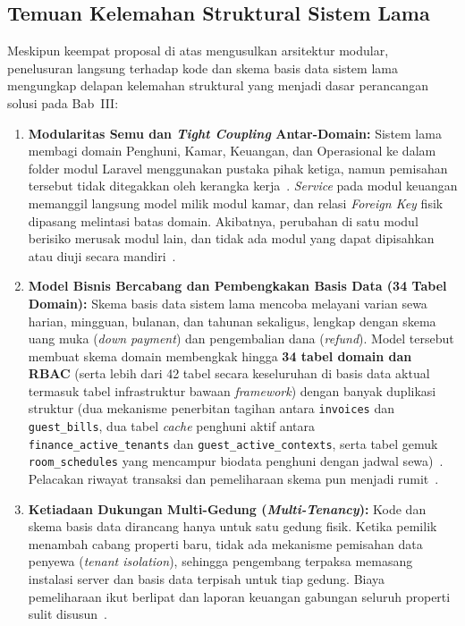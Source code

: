 \subsection{Temuan Kelemahan Struktural Sistem Lama}

Meskipun keempat proposal di atas mengusulkan arsitektur modular, penelusuran langsung terhadap kode dan skema basis data sistem lama mengungkap delapan kelemahan struktural yang menjadi dasar perancangan solusi pada Bab~III:

\begin{enumerate}[label=\arabic*., leftmargin=*]
  \item \textbf{Modularitas Semu dan \textit{Tight Coupling} Antar-Domain:}
    Sistem lama membagi domain Penghuni, Kamar, Keuangan, dan Operasional ke dalam folder modul Laravel menggunakan pustaka pihak ketiga, namun pemisahan tersebut tidak ditegakkan oleh kerangka kerja~\cite{alqoran2025}. \textit{Service} pada modul keuangan memanggil langsung model milik modul kamar, dan relasi \textit{Foreign Key} fisik dipasang melintasi batas domain. Akibatnya, perubahan di satu modul berisiko merusak modul lain, dan tidak ada modul yang dapat dipisahkan atau diuji secara mandiri~\cite{alqoran2025}.
  \item \textbf{Model Bisnis Bercabang dan Pembengkakan Basis Data (34 Tabel Domain):}
    Skema basis data sistem lama mencoba melayani varian sewa harian, mingguan, bulanan, dan tahunan sekaligus, lengkap dengan skema uang muka (\textit{down payment}) dan pengembalian dana (\textit{refund}). Model tersebut membuat skema domain membengkak hingga \textbf{34 tabel domain dan RBAC} (serta lebih dari 42 tabel secara keseluruhan di basis data aktual termasuk tabel infrastruktur bawaan \textit{framework}) dengan banyak duplikasi struktur (dua mekanisme penerbitan tagihan antara \texttt{invoices} dan \texttt{guest\_bills}, dua tabel \textit{cache} penghuni aktif antara \texttt{finance\_active\_tenants} dan \texttt{guest\_active\_contexts}, serta tabel gemuk \texttt{room\_schedules} yang mencampur biodata penghuni dengan jadwal sewa)~\cite{roihanah2025,rizal2025}. Pelacakan riwayat transaksi dan pemeliharaan skema pun menjadi rumit~\cite{rizal2025,bagus2025}.
  \item \textbf{Ketiadaan Dukungan Multi-Gedung (\textit{Multi-Tenancy}):}
    Kode dan skema basis data dirancang hanya untuk satu gedung fisik. Ketika pemilik menambah cabang properti baru, tidak ada mekanisme pemisahan data penyewa (\textit{tenant isolation}), sehingga pengembang terpaksa memasang instalasi server dan basis data terpisah untuk tiap gedung. Biaya pemeliharaan ikut berlipat dan laporan keuangan gabungan seluruh properti sulit disusun~\cite{microsoft2025}.

\end{enumerate}
